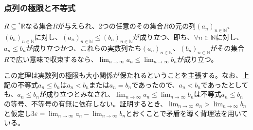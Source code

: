 \documentclass[dvipdfmx]{jsarticle}
\begin{document}
\subsubsection{点列の極限と不等式}%
\begin{thm}\label{4.1.4.12}
$R \subseteq{}^{*}\mathbb{R}$なる集合$R$が与えられ、2つの任意のその集合$R$の元の列$\left( a_{n} \right)_{n \in \mathbb{N}}$、$\left( b_{n} \right)_{n \in \mathbb{N}}$に対し、$\left( a_{n} \right)_{n \in \mathbb{N}} \leq \left( b_{n} \right)_{n \in \mathbb{N}}$が成り立つ、即ち、$\forall n \in \mathbb{N}$に対し、$a_{n} \leq b_{n}$が成り立つかつ、これらの実数列たち$\left( a_{n} \right)_{n \in \mathbb{N}}$、$\left( b_{n} \right)_{n \in \mathbb{N}}$がその集合$R$で広い意味で収束するなら、$\lim_{n \rightarrow \infty}a_{n} \leq \lim_{n \rightarrow \infty}b_{n}$が成り立つ。
\end{thm}\par
この定理は実数列の極限も大小関係が保たれるということを主張する。なお、上記の不等式$a_{n} \leq b_{n}$は$a_{n} < b_{n}$または$a_{n} = b_{n}$であったので、$a_{n} < b_{n}$であったとしても、$a_{n} \leq b_{n}$が成り立つとみなされ、$\lim_{n \rightarrow \infty}a_{n} \leq \lim_{n \rightarrow \infty}b_{n}$は不等式$a_{n} \leq b_{n}$の等号、不等号の有無に依存しない。証明するとき、$\lim_{n \rightarrow \infty}a_{n} > \lim_{n \rightarrow \infty}b_{n}$と仮定し$3\varepsilon = \lim_{n \rightarrow \infty}a_{n} - \lim_{n \rightarrow \infty}b_{n}$とおくことで矛盾を導く背理法を用いている。
\end{document}
